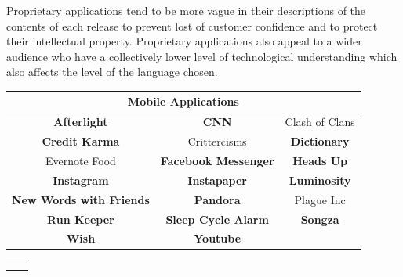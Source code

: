 \documentclass{acm_proc_article-sp}
\begin{document}
Proprietary applications tend to be more vague in their descriptions of the contents of each release to prevent lost of customer confidence and to protect their intellectual property. 
Proprietary applications also appeal to a wider audience who have a collectively lower level of technological understanding which also affects the level of the language chosen.

\begin{table}[t]
\centering
			\begin{tabular}{|c|c|c|} \hline
				\multicolumn{3}{|c|}{\large Mobile Applications}\\ \hline 
				\textbf{Afterlight\ios} & \textbf{CNN\ios} & Clash of Clans\ios \\
				\textbf{Credit Karma\ios} & Crittercisms\android & \textbf{Dictionary\ios} \\
				Evernote Food\ios & \textbf{Facebook Messenger\ios} & \textbf{Heads Up\ios}  \\
				\textbf{Instagram\android} & \textbf{Instapaper\ios} & \textbf{Luminosity\ios}  \\
				\textbf{New Words with Friends\android} & \textbf{Pandora\ios} & Plague Inc\ios \\
				\textbf{Run Keeper\ios} & \textbf{Sleep Cycle Alarm\ios} & \textbf{Songza\ios} \\
				\textbf{Wish\ios} & \textbf{Youtube\ios} & \\\hline
		\end{tabular}
\vspace{.5cm}
	
	\begin{tabular}{c c}
		\begin{tabular*}{.5\textwidth}{|c|c|}  \cline{1-2}
		
			\multicolumn{2}{|c|}{\large Desktop Applications} \\  \cline{1-2}


\end{tabular*}
\end{tabular}
\end{table}
\end{document}
